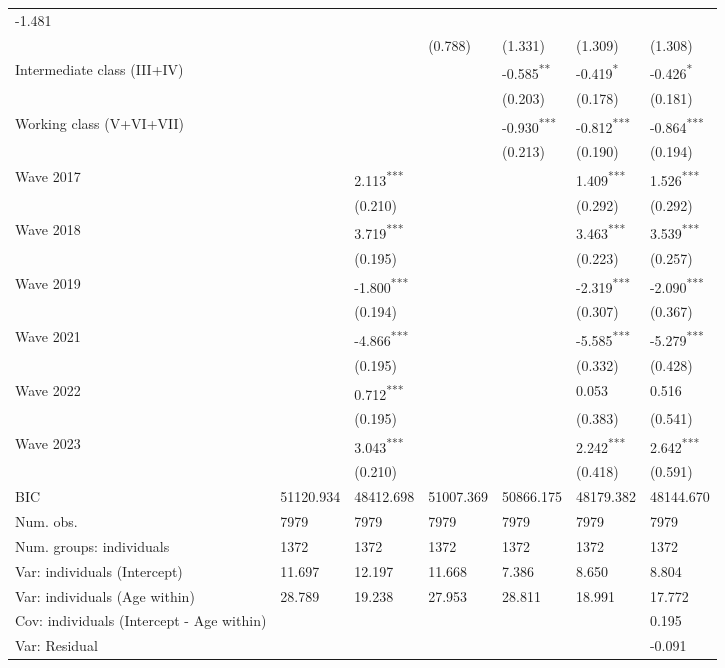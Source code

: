 \documentclass[
  spanish,
  a4paper,
  oneside]{scrbook}
\begin{document}
{\begin{longtable}[]{@{}lllllll@{}}
-1.481 \\
~ & ~ & ~ & (0.788) & (1.331) & (1.309) & (1.308) \\
Intermediate class (III+IV) & ~ & ~ & ~ & -0.585\textsuperscript{**} &
-0.419\textsuperscript{*} & -0.426\textsuperscript{*} \\
~ & ~ & ~ & ~ & (0.203) & (0.178) & (0.181) \\
Working class (V+VI+VII) & ~ & ~ & ~ & -0.930\textsuperscript{***} &
-0.812\textsuperscript{***} & -0.864\textsuperscript{***} \\
~ & ~ & ~ & ~ & (0.213) & (0.190) & (0.194) \\
Wave 2017 & ~ & 2.113\textsuperscript{***} & ~ & ~ &
1.409\textsuperscript{***} & 1.526\textsuperscript{***} \\
~ & ~ & (0.210) & ~ & ~ & (0.292) & (0.292) \\
Wave 2018 & ~ & 3.719\textsuperscript{***} & ~ & ~ &
3.463\textsuperscript{***} & 3.539\textsuperscript{***} \\
~ & ~ & (0.195) & ~ & ~ & (0.223) & (0.257) \\
Wave 2019 & ~ & -1.800\textsuperscript{***} & ~ & ~ &
-2.319\textsuperscript{***} & -2.090\textsuperscript{***} \\
~ & ~ & (0.194) & ~ & ~ & (0.307) & (0.367) \\
Wave 2021 & ~ & -4.866\textsuperscript{***} & ~ & ~ &
-5.585\textsuperscript{***} & -5.279\textsuperscript{***} \\
~ & ~ & (0.195) & ~ & ~ & (0.332) & (0.428) \\
Wave 2022 & ~ & 0.712\textsuperscript{***} & ~ & ~ & 0.053 & 0.516 \\
~ & ~ & (0.195) & ~ & ~ & (0.383) & (0.541) \\
Wave 2023 & ~ & 3.043\textsuperscript{***} & ~ & ~ &
2.242\textsuperscript{***} & 2.642\textsuperscript{***} \\
~ & ~ & (0.210) & ~ & ~ & (0.418) & (0.591) \\
BIC & 51120.934 & 48412.698 & 51007.369 & 50866.175 & 48179.382 &
48144.670 \\
Num. obs. & 7979 & 7979 & 7979 & 7979 & 7979 & 7979 \\
Num. groups: individuals & 1372 & 1372 & 1372 & 1372 & 1372 & 1372 \\
Var: individuals (Intercept) & 11.697 & 12.197 & 11.668 & 7.386 & 8.650
& 8.804 \\
Var: individuals (Age within) & 28.789 & 19.238 & 27.953 & 28.811 &
18.991 & 17.772 \\
Cov: individuals (Intercept - Age within) & ~ & ~ & ~ & ~ & ~ & 0.195 \\
Var: Residual & ~ & ~ & ~ & ~ & ~ & -0.091 \\

\end{longtable}

}
\end{document}
